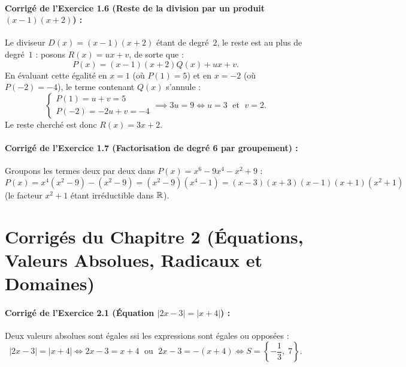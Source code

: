 \paragraph{Corrigé de l'Exercice 1.6 (Reste de la division par un produit $(x - 1)(x + 2)$) :}
Le diviseur $D(x) = (x - 1)(x + 2)$ étant de degré~$2$, le reste est au plus de degré~$1$ : posons $R(x) = ux + v$, de sorte que :
\[
    P(x) = (x - 1)(x + 2)Q(x) + ux + v.
\]
En évaluant cette égalité en $x = 1$ (où $P(1) = 5$) et en $x = -2$ (où $P(-2) = -4$), le terme contenant $Q(x)$ s'annule :
\[
    \begin{cases}
        P(1) = u + v = 5 \\
        P(-2) = -2u + v = -4
    \end{cases}
    \implies 3u = 9 \iff u = 3 \;\text{ et }\; v = 2.
\]
Le reste cherché est donc $\boxed{R(x) = 3x + 2}$.

\paragraph{Corrigé de l'Exercice 1.7 (Factorisation de degré 6 par groupement) :}
Groupons les termes deux par deux dans $P(x) = x^6 - 9x^4 - x^2 + 9$ :
\[
    P(x) = x^4(x^2 - 9) - (x^2 - 9) = (x^2 - 9)(x^4 - 1) = \boxed{(x - 3)(x + 3)(x - 1)(x + 1)(x^2 + 1)}
\]
(le facteur $x^2 + 1$ étant irréductible dans $\mathbb{R}$).

\section{Corrigés du Chapitre 2 (Équations, Valeurs Absolues, Radicaux et Domaines)}

\paragraph{Corrigé de l'Exercice 2.1 (Équation $|2x - 3| = |x + 4|$) :}
Deux valeurs absolues sont égales ssi les expressions sont égales ou opposées :
\[
    |2x - 3| = |x + 4| \iff 2x - 3 = x + 4 \;\text{ ou }\; 2x - 3 = -(x + 4) \iff \boxed{S = \left\{-\frac{1}{3},\; 7\right\}}.
\]

